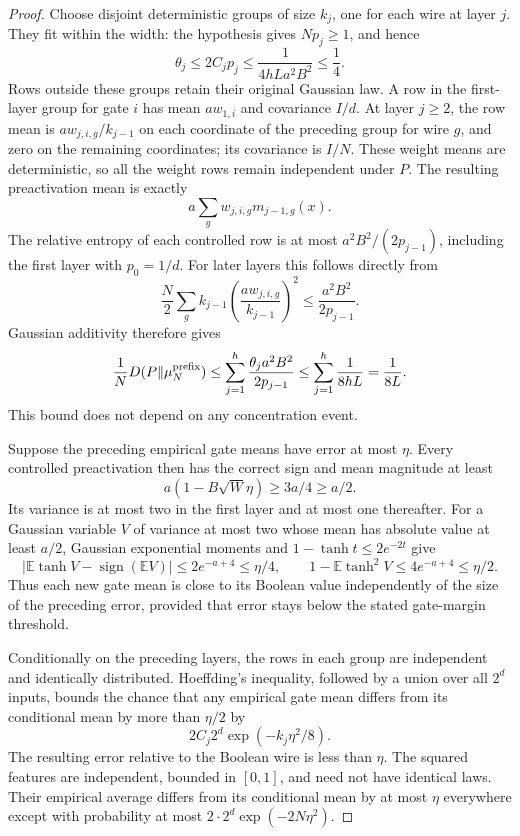 \begin{proof}
Choose disjoint deterministic groups of size $k_j$, one for each wire
at layer $j$.  They fit within the width: the hypothesis gives
$Np_j\ge1$, and hence
\[
 \theta_j\le2C_jp_j\le\frac1{4hLa^2B^2}\le\frac14.
\]
Rows outside these groups retain their original Gaussian law.  A row
in the first-layer group for gate $i$ has mean $aw_{1,i}$ and covariance
$I/d$.  At layer $j\ge2$, the row mean is $aw_{j,i,g}/k_{j-1}$ on
each coordinate of the preceding group for wire $g$, and zero on the
remaining coordinates; its covariance is $I/N$.  These weight means
are deterministic, so all the weight rows remain independent under $P$.
The resulting preactivation mean is exactly
\[
 a\sum_g w_{j,i,g}m_{j-1,g}(x).
\]
The relative entropy of each controlled row is at most
$a^2B^2/(2p_{j-1})$, including the first layer with $p_0=1/d$.
For later layers this follows directly from
\[
 \frac N2\sum_g k_{j-1}
       \left(\frac{aw_{j,i,g}}{k_{j-1}}\right)^2
 \le\frac{a^2B^2}{2p_{j-1}}.
\]
Gaussian additivity therefore gives
\[
 \frac1N D(P\Vert\mu_N^{\rm prefix})
 \le\sum_{j=1}^h\frac{\theta_ja^2B^2}{2p_{j-1}}
 \le\sum_{j=1}^h\frac1{8hL}=\frac1{8L}.
\]
This bound does not depend on any concentration event.

Suppose the preceding empirical gate means have error at most $\eta$.
Every controlled preactivation then has the correct sign and mean
magnitude at least
\[
 a(1-B\sqrt W\eta)\ge3a/4\ge a/2.
\]
Its variance is at most two in the first layer and at most one
thereafter.  For a Gaussian variable $V$ of variance at most two whose
mean has absolute value at least $a/2$, Gaussian exponential moments
and $1-\tanh t\le2e^{-2t}$ give
\[
 |\mathbb E\tanh V-\operatorname{sign}(\mathbb EV)|
       \le2e^{-a+4}\le\eta/4,
 \qquad
 1-\mathbb E\tanh^2V\le4e^{-a+4}\le\eta/2.
\]
Thus each new gate mean is close to its Boolean value independently
of the size of the preceding error, provided that error stays below
the stated gate-margin threshold.

Conditionally on the preceding layers, the rows in each group are
independent and identically distributed.  Hoeffding's inequality,
followed by a union over all $2^d$ inputs, bounds the chance that any
empirical gate mean differs from its conditional mean by more than
$\eta/2$ by
\[
 2C_j2^d\exp(-k_j\eta^2/8).
\]
The resulting error relative to the Boolean wire is less than $\eta$.
The squared features are independent, bounded in $[0,1]$, and need
not have identical laws.  Their empirical average differs from its
conditional mean by at most $\eta$ everywhere except with probability
at most $2\cdot2^d\exp(-2N\eta^2)$.


\end{proof}
